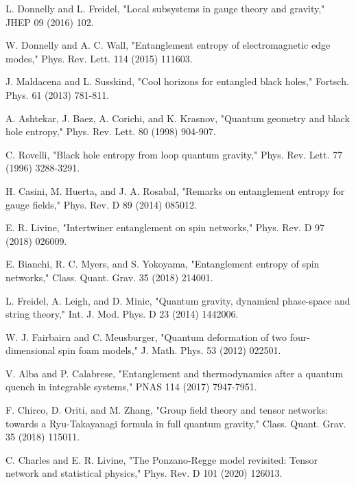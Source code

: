 \documentclass[11pt, a4paper]{article}
\theoremstyle{plain}
\theoremstyle{definition}
\theoremstyle{remark}
\begin{document}

\begin{thebibliography}{99}

 L. Donnelly and L. Freidel, "Local subsystems in gauge theory and gravity," JHEP 09 (2016) 102.

 W. Donnelly and A. C. Wall, "Entanglement entropy of electromagnetic edge modes," Phys. Rev. Lett. 114 (2015) 111603.

 J. Maldacena and L. Susskind, "Cool horizons for entangled black holes," Fortsch. Phys. 61 (2013) 781-811.

 A. Ashtekar, J. Baez, A. Corichi, and K. Krasnov, "Quantum geometry and black hole entropy," Phys. Rev. Lett. 80 (1998) 904-907.

 C. Rovelli, "Black hole entropy from loop quantum gravity," Phys. Rev. Lett. 77 (1996) 3288-3291.

 H. Casini, M. Huerta, and J. A. Rosabal, "Remarks on entanglement entropy for gauge fields," Phys. Rev. D 89 (2014) 085012.

 E. R. Livine, "Intertwiner entanglement on spin networks," Phys. Rev. D 97 (2018) 026009.

 E. Bianchi, R. C. Myers, and S. Yokoyama, "Entanglement entropy of spin networks," Class. Quant. Grav. 35 (2018) 214001.

 L. Freidel, A. Leigh, and D. Minic, "Quantum gravity, dynamical phase-space and string theory," Int. J. Mod. Phys. D 23 (2014) 1442006.

 W. J. Fairbairn and C. Meusburger, "Quantum deformation of two four-dimensional spin foam models," J. Math. Phys. 53 (2012) 022501.

 V. Alba and P. Calabrese, "Entanglement and thermodynamics after a quantum quench in integrable systems," PNAS 114 (2017) 7947-7951.

 F. Chirco, D. Oriti, and M. Zhang, "Group field theory and tensor networks: towards a Ryu-Takayanagi formula in full quantum gravity," Class. Quant. Grav. 35 (2018) 115011.

 C. Charles and E. R. Livine, "The Ponzano-Regge model revisited: Tensor network and statistical physics," Phys. Rev. D 101 (2020) 126013.


\end{thebibliography}
\end{document}

